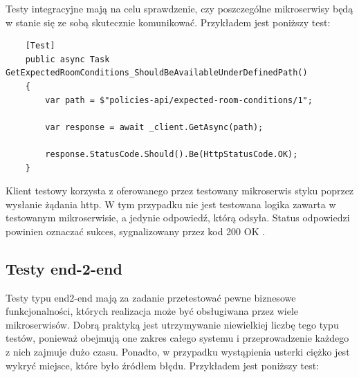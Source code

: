 \documentclass[11pt, a4]{article} %
\begin{document}
Testy integracyjne mają na celu sprawdzenie, czy poszczególne mikroserwisy będą 
w stanie się ze sobą skutecznie komunikować. Przykładem jest poniższy test:

\begin{lstlisting}
    [Test]
    public async Task GetExpectedRoomConditions_ShouldBeAvailableUnderDefinedPath()
    {
        var path = $"policies-api/expected-room-conditions/1";
    
        var response = await _client.GetAsync(path);
    
        response.StatusCode.Should().Be(HttpStatusCode.OK);
    }    
\end{lstlisting}

Klient testowy korzysta z oferowanego przez testowany mikroserwis styku poprzez 
wysłanie żądania http. W tym przypadku nie jest testowana logika zawarta w testowanym 
mikroserwisie, a jedynie odpowiedź, którą odsyła. Status odpowiedzi powinien oznaczać 
sukces, sygnalizowany przez kod 200 OK \parencite{fielding:1999ae}.

\subsection{Testy end-2-end}

Testy typu end2-end mają za zadanie przetestować pewne biznesowe 
funkcjonalności, których realizacja może być obsługiwana przez wiele mikroserwisów. 
Dobrą praktyką jest utrzymywanie niewielkiej liczbę tego typu testów, ponieważ 
obejmują one zakres całego systemu i przeprowadzenie każdego z nich zajmuje dużo 
czasu. Ponadto, w przypadku wystąpienia usterki ciężko jest wykryć miejsce, które 
było źródłem błędu.
Przykładem jest poniższy test:
\end{document}
